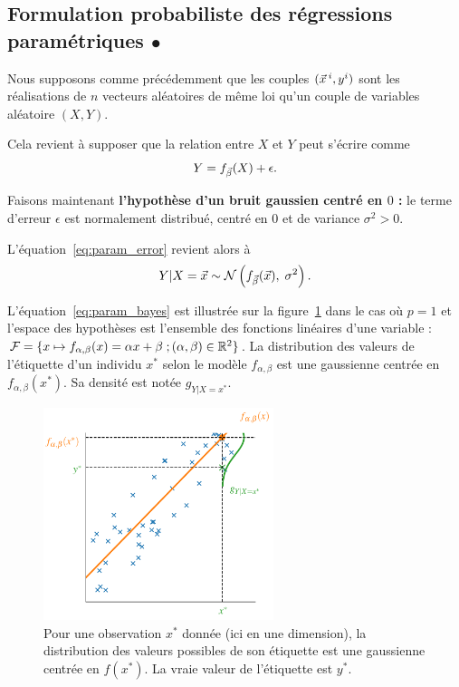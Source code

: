 \subsection{Formulation probabiliste des régressions paramétriques $\bullet$}
Nous supposons comme précédemment que les couples $(\xx^i, y^i)$ sont les
réalisations de $n$ vecteurs aléatoires de même loi qu'un couple de variables
aléatoire $(X, Y).$ 

Cela revient à supposer que la relation entre $X$ et $Y$ peut s'écrire comme 
\begin{equation}
  \label{eq:param_error}
  Y = f_{\bbeta}(X) + \epsilon. 
\end{equation}

Faisons maintenant \textbf{l'hypothèse d'un bruit gaussien centré en $0$ : } le
terme d'erreur $\epsilon$ est normalement distribué, centré en $0$ et de variance $\sigma^2 >0$.

L'équation~\eqref{eq:param_error} revient alors à 
\begin{equation}
  \label{eq:param_bayes}
  Y|X=\xx \sim  \Ncal\left(f_{\bbeta}(\xx), \; \sigma^2\right).
\end{equation}


\begin{exemple}
  L'équation~\eqref{eq:param_bayes} est illustrée sur la
  figure~\ref{fig:linreg} dans le cas où $p=1$ et l'espace des hypothèses est
  l'ensemble des fonctions linéaires d'une variable :
  $\mathcal{F} = \{ x \mapsto f_{\alpha, \beta}(x) = \alpha x + \beta \; ; (\alpha,
  \beta) \in \mathbb{R}^2 \}$.
  La distribution des valeurs de l'étiquette d'un individu $x^*$ selon le
  modèle $f_{\alpha, \beta}$ est une gaussienne centrée en
  $f_{\alpha, \beta}(x^*)$. Sa densité est notée $g_{Y|X=x^*}$. 
\end{exemple}

\begin{figure}[h]
  \centering
  \includegraphics[width=0.6\textwidth]{figures/erm/linreg}
  \caption{Pour une observation $x^*$ donnée (ici en une dimension), la
    distribution des valeurs possibles de son étiquette est une gaussienne
    centrée en $f(x^*)$. La vraie valeur de l'étiquette est $y^*$.}
  \label{fig:linreg}
\end{figure}


